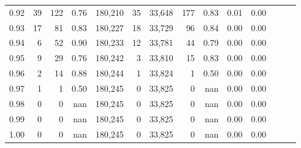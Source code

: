 \begin{tabular}{rrrrrrrrrrrrrr}
0.92 &     39 &  122 &  0.76 &  180,210 &       35 &  33,648 &     177 &  0.83 &  0.01 &      0.00 \\
0.93 &     17 &   81 &  0.83 &  180,227 &       18 &  33,729 &      96 &  0.84 &  0.00 &      0.00 \\
0.94 &      6 &   52 &  0.90 &  180,233 &       12 &  33,781 &      44 &  0.79 &  0.00 &      0.00 \\
0.95 &      9 &   29 &  0.76 &  180,242 &        3 &  33,810 &      15 &  0.83 &  0.00 &      0.00 \\
0.96 &      2 &   14 &  0.88 &  180,244 &        1 &  33,824 &       1 &  0.50 &  0.00 &      0.00 \\
0.97 &      1 &    1 &  0.50 &  180,245 &        0 &  33,825 &       0 &   nan &  0.00 &      0.00 \\
0.98 &      0 &    0 &   nan &  180,245 &        0 &  33,825 &       0 &   nan &  0.00 &      0.00 \\
0.99 &      0 &    0 &   nan &  180,245 &        0 &  33,825 &       0 &   nan &  0.00 &      0.00 \\
1.00 &      0 &    0 &   nan &  180,245 &        0 &  33,825 &       0 &   nan &  0.00 &      0.00 \\
\bottomrule
\end{tabular}
